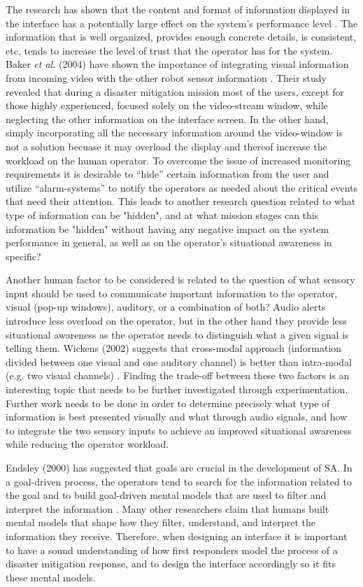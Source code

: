 \documentclass[12pt, letterpaper, oneside]{article}
\begin{document}
The research has shown that the content and format of information displayed in the interface has a potentially large effect on the system's performance level \cite{1, 2}. The information that is well organized, provides enough concrete details, is consistent, etc, tends to increase the level of trust that the operator has for the system. Baker \emph{et al.} (2004) have shown the importance of integrating visual information from incoming video with the other robot sensor information \cite{22}. Their study revealed that during a disaster mitigation mission most of the users, except for those highly experienced, focused solely on the video-stream window, while neglecting the other information on the interface screen. In the other hand, simply incorporating all the necessary information around the video-window is not a solution becuase it may overload the display and thereof increase the workload on the human operator. To overcome the issue of increased monitoring requirements it is desirable to “hide” certain information from the user and utilize “alarm-systems” to notify the operators as needed about the critical events that need their attention. This leads to another research question related to what type of information can be "hidden", and at what mission stages can this information be "hidden" without having any negative impact on the system performance in general, as well as on the operator's situational awareness in specific? 

Another human factor to be considered is related to the question of what sensory input should be used to communicate important information to the operator, visual (pop-up windows), auditory, or a combination of both? Audio alerts introduce less overload on the operator, but in the other hand they provide less situational awareness as the operator needs to distinguish what a given signal is telling them. Wickens (2002) suggests that cross-modal approach (information divided between one visual and one auditory channel) is better than intra-modal (e.g. two visual channels) \cite{3}. Finding the trade-off between these two factors is an interesting topic that needs to be further investigated through experimentation. Further work needs to be done in order to determine precisely what type of information is best presented visually and what through audio signals, and how to integrate the two sensory inputs to achieve an improved situational awareness while reducing the operator workload. 

Endsley (2000) has suggested that goals are crucial in the development of SA. In a goal-driven process, the operators tend to search for the information related to the goal and to build goal-driven mental models that are used to filter and interpret the information \cite{26}. Many other researchers claim that humans built mental models that shape how they filter, understand, and interpret the information they receive. Therefore, when designing an interface it is important to have a sound understanding of how first responders model the process of a disaster mitigation response, and to design the interface accordingly so it fits these mental models. 
\end{document}
